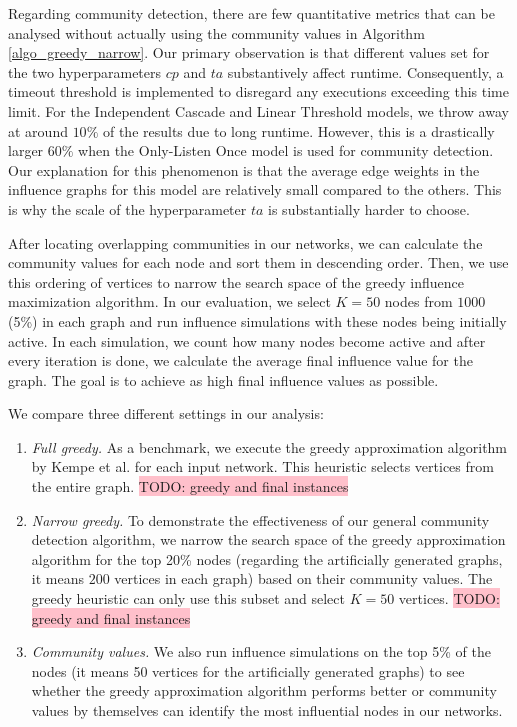 \documentclass[pdflatex,sn-mathphys-num]{sn-jnl}
\begin{document}
Regarding community detection, there are few quantitative metrics that can be analysed without actually using the community values in Algorithm \ref{algo_greedy_narrow}. Our primary observation is that different values set for the two hyperparameters $cp$ and $ta$ substantively affect runtime. Consequently, a timeout threshold is implemented to disregard any executions exceeding this time limit. For the Independent Cascade and Linear Threshold models, we throw away at around $10\%$ of the results due to long runtime. However, this is a drastically larger $60\%$ when the Only-Listen Once model is used for community detection. Our explanation for this phenomenon is that the average edge weights in the influence graphs for this model are relatively small compared to the others. This is why the scale of the hyperparameter $ta$ is substantially harder to choose.

After locating overlapping communities in our networks, we can calculate the community values for each node and sort them in descending order. Then, we use this ordering of vertices to narrow the search space of the greedy influence maximization algorithm. In our evaluation, we select $K = 50$ nodes from $1000$ (5\%) in each graph and run influence simulations with these nodes being initially active. In each simulation, we count how many nodes become active and after every iteration is done, we calculate the average final influence value for the graph. The goal is to achieve as high final influence values as possible.

We compare three different settings in our analysis:

\begin{enumerate}

  \item \textit{Full greedy.} As a benchmark, we execute the greedy approximation algorithm by Kempe et al. for each input network. This heuristic selects vertices from the entire graph. \colorbox{pink}{TODO: greedy and final instances}
  
  \item \textit{Narrow greedy.} To demonstrate the effectiveness of our general community detection algorithm, we narrow the search space of the greedy approximation algorithm for the top 20\% nodes (regarding the artificially generated graphs, it means $200$ vertices in each graph) based on their community values. The greedy heuristic can only use this subset and select $K = 50$ vertices. \colorbox{pink}{TODO: greedy and final instances}
  
  \item \textit{Community values.} We also run influence simulations on the top 5\% of the nodes (it means 50 vertices for the artificially generated graphs) to see whether the greedy approximation algorithm performs better or community values by themselves can identify the most influential nodes in our networks.

\end{enumerate}
\end{document}
